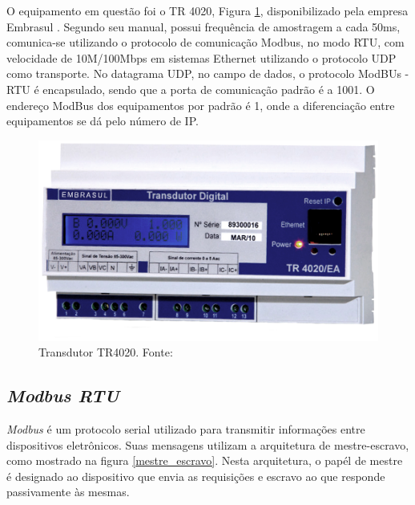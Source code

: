 O equipamento em questão foi o TR 4020, Figura \ref{tr4020}, disponibilizado pela empresa Embrasul \cite{embrasul}. Segundo seu manual, possui frequência de amostragem a cada 50ms, comunica-se utilizando o protocolo de comunicação Modbus, no modo RTU, com velocidade de 10M/100Mbps em sistemas Ethernet utilizando o protocolo UDP como transporte. No datagrama UDP, no campo de dados, o protocolo ModBUs - RTU é encapsulado, sendo que a porta de comunicação padrão é a 1001. O endereço ModBus dos equipamentos por padrão é 1, onde a diferenciação entre equipamentos se dá pelo número de IP.

\begin{figure}[!h]
    \centering
    \includegraphics[keepaspectratio=true,scale=0.5]{figuras/tr4020.eps}
    \caption{Transdutor TR4020. Fonte: \cite{embrasul}}
    \label{tr4020}
\end{figure}

    \subsection{\textit{Modbus RTU}}

    \textit{Modbus} \cite{modbus} é um protocolo serial utilizado para transmitir informações entre dispositivos eletrônicos. Suas mensagens utilizam a arquitetura de mestre-escravo, como mostrado na figura \ref{mestre_escravo}. Nesta arquitetura, o papél de mestre é designado ao dispositivo que envia as requisições e escravo ao que responde passivamente às mesmas.

